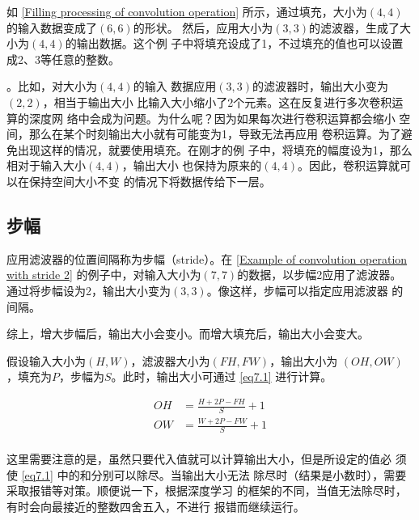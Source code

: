 如 \autoref{Filling processing of convolution operation} 所示，通过填充，大小为$(4, 4)$的输入数据变成了$(6, 6)$的形状。
然后，应用大小为$(3, 3)$的滤波器，生成了大小为$(4, 4)$的输出数据。这个例
子中将填充设成了1，不过填充的值也可以设置成2、3等任意的整数。

\begin{tcolorbox}
    。比如，对大小为$(4, 4)$的输入
    数据应用$(3, 3)$的滤波器时，输出大小变为$(2, 2)$，相当于输出大小
    比输入大小缩小了2个元素。这在反复进行多次卷积运算的深度网
    络中会成为问题。为什么呢？因为如果每次进行卷积运算都会缩小
    空间，那么在某个时刻输出大小就有可能变为1，导致无法再应用
    卷积运算。为了避免出现这样的情况，就要使用填充。在刚才的例
    子中，将填充的幅度设为1，那么相对于输入大小$(4, 4)$，输出大小
    也保持为原来的$(4, 4)$。因此，卷积运算就可以在保持空间大小不变
    的情况下将数据传给下一层。
\end{tcolorbox}

\subsection{步幅}
应用滤波器的位置间隔称为步幅（stride）。在 \autoref{Example of convolution operation with stride 2} 的例子中，对输入大小为$(7, 7)$的数据，以步幅2应用了滤波器。
通过将步幅设为2，输出大小变为$(3, 3)$。像这样，步幅可以指定应用滤波器
的间隔。


综上，增大步幅后，输出大小会变小。而增大填充后，输出大小会变大。

假设输入大小为$(H, W)$，滤波器大小为$(FH, FW)$，输出大小为
$(OH, OW)$，填充为$P$，步幅为$S$。此时，输出大小可通过 \autoref{eq7.1} 进行计算。

\begin{equation}
    \label{eq7.1}
    \begin{aligned}
        OH & =\frac{H+2P-FH}{S}+1 \\
        OW & =\frac{W+2P-FW}{S}+1 \\
    \end{aligned}
\end{equation}

这里需要注意的是，虽然只要代入值就可以计算输出大小，但是所设定的值必
须使 \autoref{eq7.1} 中的和分别可以除尽。当输出大小无法
除尽时（结果是小数时），需要采取报错等对策。顺便说一下，根据深度学习
的框架的不同，当值无法除尽时，有时会向最接近的整数四舍五入，不进行
报错而继续运行。

